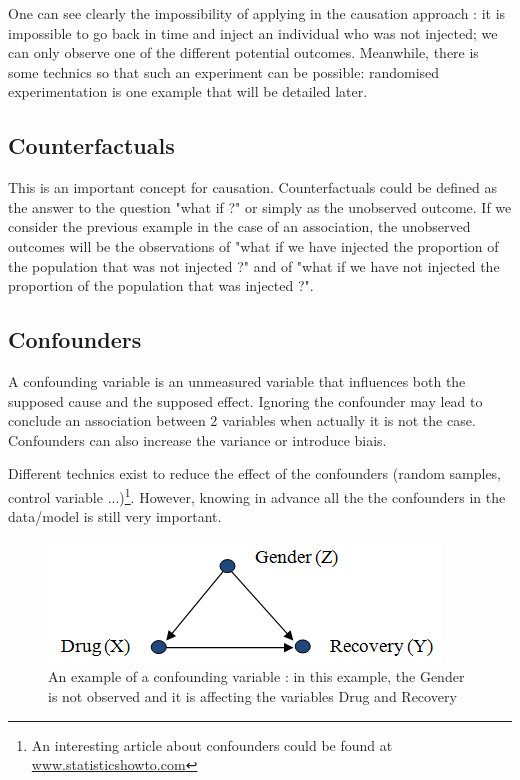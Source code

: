\documentclass{article}
\begin{document}
One can see clearly the impossibility of applying in the causation approach : it is impossible to go back in time and inject an individual who was not injected; we can only observe one of the different potential outcomes. Meanwhile, there is some technics so that such an experiment can be possible: randomised experimentation is one example that will be detailed later.


\subsection{Counterfactuals}

This is an important concept for causation. Counterfactuals could be defined as the answer to the question "what if ?" or simply as the unobserved outcome. If we consider the previous example in the case of an association, the unobserved outcomes will be the observations of "what if we have injected the proportion of the population that was not injected ?" and of "what if we have not injected the proportion of the population that was injected ?".


\subsection{Confounders}

A confounding variable is an unmeasured variable that influences both the supposed cause and the supposed effect. Ignoring the confounder may lead to conclude an association between 2 variables when actually it is not the case. Confounders can also increase the variance or introduce biais.

Different technics exist to reduce the effect of the confounders (random samples, control variable ...)\footnote{An interesting article about confounders could be found at \href{https://www.statisticshowto.com/experimental-design/confounding-variable/}{www.statisticshowto.com}}. However, knowing in advance all the the confounders in the data/model is still very important.

\begin{figure}[h]
\centering
\includegraphics[width=0.5 \textwidth]{figures/confounding.png}
\caption{An example of a confounding variable : in this example, the Gender is not observed and it is affecting the variables Drug and Recovery}
\end{figure}
\end{document}
